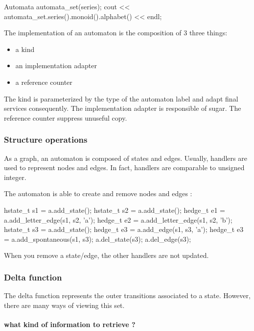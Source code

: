 \documentclass{article}
\begin{document}
\begin{code}
\begin{code}
Automata automata_set(series);
cout << automata_set.series().monoid().alphabet() << endl;
\end{code}

The implementation of an automaton is the composition of 3 three things:

\begin{itemize}
\item a kind
\item an implementation adapter
\item a reference counter
\end{itemize}

The kind is parameterized by the type of the automaton label and adapt final services consequently. The implementation adapter is responsible of sugar. The reference counter suppress unuseful copy.

\subsubsection{Structure operations}

As a graph, an automaton is composed of states and edges. Usually, handlers are used to represent nodes and edges. In fact, handlers are comparable to unsigned integer. 

The automaton is able to create and remove nodes and edges :

\begin{code}
hstate_t s1 = a.add_state();
hstate_t s2 = a.add_state();
hedge_t e1 = a.add_letter_edge(s1, s2, 'a');
hedge_t e2 = a.add_letter_edge(s1, s2, 'b');
hstate_t s3 = a.add_state();
hedge_t e3 = a.add_edge(s1, s3, 'a');
hedge_t e3 = a.add_spontaneous(s1, s3);
a.del_state(s3);
a.del_edge(s3);
\end{code}

When you remove a state/edge, the other handlers are not updated.

\subsubsection{Delta function}

The delta function represents the outer transitions associated to a state. However, there are many ways of viewing this set. 

\paragraph{what kind of information to retrieve ?}


\end{code}
\end{document}
